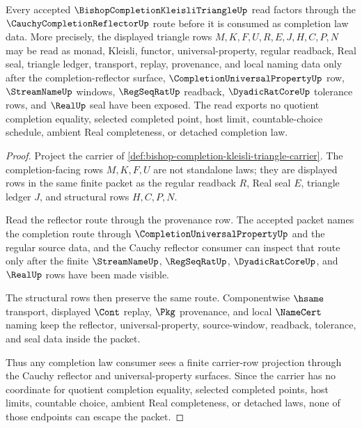 \begin{theorem}
\label{thm:bishop-completion-kleisli-triangle-cauchy-reflector-link}
Every accepted $\BishopCompletionKleisliTriangleUp$ read factors through the $\CauchyCompletionReflectorUp$ route before it is consumed as completion law data. More precisely, the displayed triangle rows $M,K,F,U,R,E,J,H,C,P,N$ may be read as monad, Kleisli, functor, universal-property, regular readback, Real seal, triangle ledger, transport, replay, provenance, and local naming data only after the completion-reflector surface, $\CompletionUniversalPropertyUp$ row, $\StreamNameUp$ windows, $\RegSeqRatUp$ readback, $\DyadicRatCoreUp$ tolerance rows, and $\RealUp$ seal have been exposed. The read exports no quotient completion equality, selected completed point, host limit, countable-choice schedule, ambient Real completeness, or detached completion law.
\end{theorem}
\begin{proof}
Project the carrier of \autoref{def:bishop-completion-kleisli-triangle-carrier}. The completion-facing rows $M,K,F,U$ are not standalone laws; they are displayed rows in the same finite packet as the regular readback $R$, Real seal $E$, triangle ledger $J$, and structural rows $H,C,P,N$.

Read the reflector route through the provenance row. The accepted packet names the completion route through $\CompletionUniversalPropertyUp$ and the regular source data, and the Cauchy reflector consumer can inspect that route only after the finite $\StreamNameUp$, $\RegSeqRatUp$, $\DyadicRatCoreUp$, and $\RealUp$ rows have been made visible.

The structural rows then preserve the same route. Componentwise $\hsame$ transport, displayed $\Cont$ replay, $\Pkg$ provenance, and local $\NameCert$ naming keep the reflector, universal-property, source-window, readback, tolerance, and seal data inside the packet.

Thus any completion law consumer sees a finite carrier-row projection through the Cauchy reflector and universal-property surfaces. Since the carrier has no coordinate for quotient completion equality, selected completed points, host limits, countable choice, ambient Real completeness, or detached laws, none of those endpoints can escape the packet.
\end{proof}
